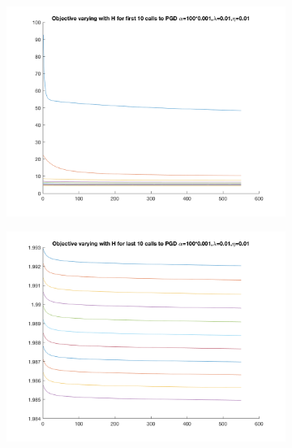\documentclass{article}
\newcommand{\0}{\mathrm{0}}
\newcommand{\1}{\mathrm{1}}
\begin{document}
\begin{figure}[H]
    \centering
  \begin{subfigure}[b]{0.3\textwidth}
    \includegraphics[width=\textwidth]{fixed-step-change-alpha-H100.png}
  \end{subfigure}
\centering
  \begin{subfigure}[b]{0.3\textwidth}
    \includegraphics[width=\textwidth]{fixed-step-change-alpha-H100last.png}
  \end{subfigure}
\centering
  \begin{subfigure}[b]{0.3\textwidth}

\end{subfigure}
\end{figure}
\end{document}

